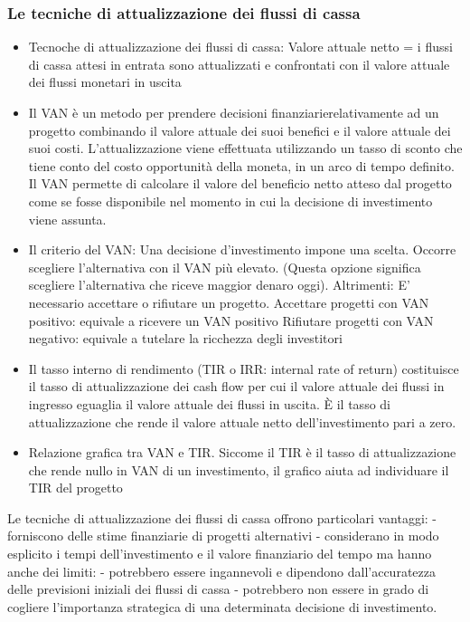 \documentclass{article}
\begin{document}
\subsubsection{Le tecniche di attualizzazione dei flussi di cassa}
\begin{itemize}
\item Tecnoche di attualizzazione dei flussi di cassa:
 Valore attuale netto = i flussi di cassa attesi in entrata sono attualizzati
 e confrontati con il valore attuale dei flussi monetari in uscita
\item Il VAN è un metodo per prendere decisioni finanziarierelativamente
ad un progetto combinando il valore attuale dei suoi benefici e il
valore attuale dei suoi costi. L’attualizzazione viene effettuata
utilizzando un tasso di sconto che tiene conto del costo
opportunità della moneta, in un arco di tempo definito. Il VAN
permette di calcolare il valore del beneficio netto atteso dal progetto
come se fosse disponibile nel momento in cui la decisione di
investimento viene assunta.
\item  Il criterio del VAN:
Una decisione d’investimento impone una scelta.
Occorre scegliere l’alternativa con il VAN più elevato.
(Questa opzione significa scegliere l’alternativa che riceve maggior
denaro oggi).
Altrimenti:
E’ necessario accettare o rifiutare un progetto.
Accettare progetti con VAN positivo: equivale a ricevere un VAN
positivo
Rifiutare progetti con VAN negativo: equivale a tutelare la
ricchezza degli investitori
\item Il tasso interno di rendimento (TIR o IRR: internal rate of return)
costituisce il tasso di attualizzazione dei cash flow per cui il valore attuale
dei flussi in ingresso eguaglia il valore attuale dei flussi in uscita.
È il tasso di attualizzazione che rende il valore attuale netto
dell’investimento pari a zero.
\item Relazione grafica tra VAN e TIR. Siccome il TIR è il tasso di
attualizzazione che rende nullo in VAN di un investimento, il
grafico aiuta ad individuare il TIR del progetto
\end{itemize}
Le tecniche di attualizzazione dei flussi di cassa offrono particolari
vantaggi:
- forniscono delle stime finanziarie di progetti alternativi
- considerano in modo esplicito i tempi dell’investimento e il valore
finanziario del tempo
ma hanno anche dei limiti:
- potrebbero essere ingannevoli e dipendono dall’accuratezza delle
previsioni iniziali dei flussi di cassa
- potrebbero non essere in grado di cogliere l’importanza strategica di
una determinata decisione di investimento.
\end{document}
